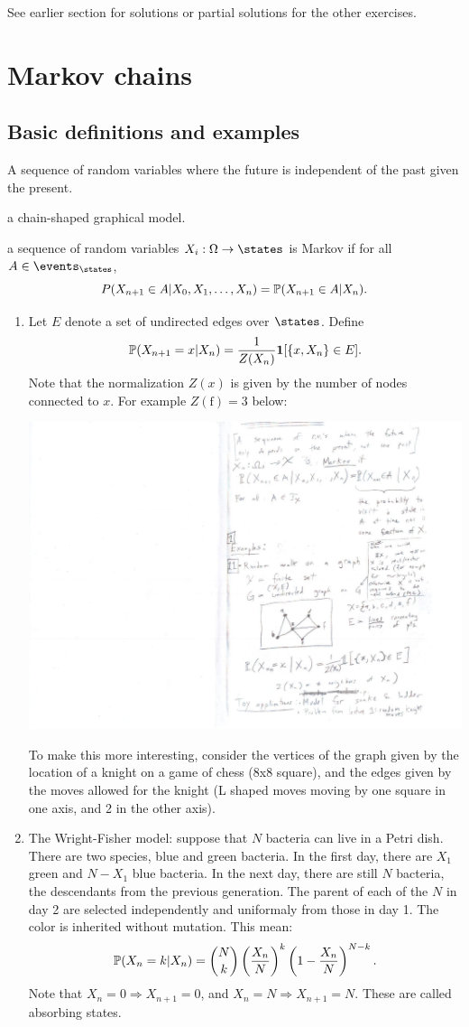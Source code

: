 \documentclass{article}
\begin{document}
See earlier section for solutions or partial solutions for the other exercises.


\section{Markov chains}

\subsection{Basic definitions and examples}

 A sequence of random variables where the future is independent of the past given the present. 

 a chain-shaped graphical model.

 a sequence of random variables $X_i : \Omega \to \states$ is Markov if for all $A \in \events_\states$, 
\[ P(X_{n+1} \in A | X_0, X_1, \dots, X_n) = \P(X_{n+1} \in A | X_n). \]

\begin{enumerate}
  \item Let $E$ denote a set of undirected edges over $\states$. Define \[ \P(X_{n+1} = x | X_n) = \frac{1}{Z(X_n)} \1[\{x, X_n\} \in E]. \]Note that the normalization $Z(x)$ is given by the number of nodes connected to $x$. For example $Z(\text{f}) = 3$ below: 
  \begin{center}
  	\includegraphics[width=0.3\linewidth]{figures/discrete-graph} 
  \end{center}
  To make this more interesting, consider the vertices of the graph given by the location of a knight on a game of chess (8x8 square), and the edges given by the moves allowed for the knight (L shaped moves moving by one square in one axis, and 2 in the other axis). 
  \item The Wright-Fisher model: suppose that $N$ bacteria can live in a Petri dish. There are two species, blue and green bacteria. In the first day, there are $X_1$ green and $N-X_1$ blue bacteria. In the next day, there are still $N$ bacteria, the descendants from the previous generation. The parent of each of the $N$ in day 2 are selected independently and uniformaly from those in day 1. The color is inherited without mutation. This mean: \[ \P(X_n = k | X_n) = \binom{N}{k} \left(\frac{X_n}{N}\right)^k \left( 1 - \frac{X_n}{N}\right)^{N-k}. \]Note that $X_n = 0 \Rightarrow X_{n+1} = 0$, and $X_n = N \Rightarrow X_{n+1} = N$. These are called absorbing states.  
\end{enumerate}
\end{document}
